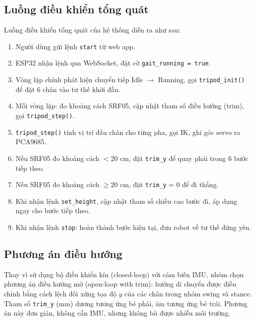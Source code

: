         \subsection{Luồng điều khiển tổng quát}

        \hspace{0.5cm} Luồng điều khiển tổng quát của hệ thống diễn ra như sau:

        \begin{enumerate}
            \item Người dùng gửi lệnh \texttt{start} từ web app.
            \item ESP32 nhận lệnh qua WebSocket, đặt cờ \texttt{gait\_running = true}.
            \item Vòng lặp chính phát hiện chuyển tiếp Idle $\to$ Running, gọi \texttt{tripod\_init()} để đặt 6 chân vào tư thế khởi đầu.
            \item Mỗi vòng lặp: đo khoảng cách SRF05, cập nhật tham số điều hướng (trim), gọi \texttt{tripod\_step()}.
            \item \texttt{tripod\_step()} tính vị trí đầu chân cho từng pha, gọi IK, ghi góc servo ra PCA9685.
            \item Nếu SRF05 đo khoảng cách $< 20$ cm, đặt \texttt{trim\_y} để quay phải trong 6 bước tiếp theo.
            \item Nếu SRF05 đo khoảng cách $\geq 20$ cm, đặt \texttt{trim\_y} = 0 để đi thẳng.
            \item Khi nhận lệnh \texttt{set\_height}, cập nhật tham số chiều cao bước đi, áp dụng ngay cho bước tiếp theo.
            \item Khi nhận lệnh \texttt{stop}: hoàn thành bước hiện tại, đưa robot về tư thế đứng yên.
        \end{enumerate}

        \subsection{Phương án điều hướng}

        \hspace{0.5cm} Thay vì sử dụng bộ điều khiển kín (closed-loop) với cảm biến IMU, nhóm chọn phương án điều hướng mở (open-loop with trim): hướng di chuyển được điều chỉnh bằng cách lệch đối xứng tọa độ $y$ của các chân trong nhóm swing và stance. Tham số \texttt{trim\_y} (mm) dương tương ứng bẻ phải, âm tương ứng bẻ trái. Phương án này đơn giản, không cần IMU, nhưng không bù được nhiễu môi trường.

